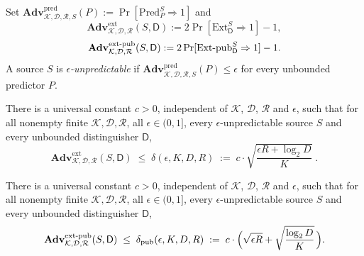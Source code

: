 \documentclass{aicr-conjecture}
\newcommand{\Adv}{\mathbf{Adv}}
\newcommand{\Pred}{\mathrm{Pred}}
\newcommand{\Ext}{\mathrm{Ext}}
\newcommand{\ExtP}{\mathrm{Ext}\text{-}\mathrm{pub}}
\newcommand{\pred}{\mathrm{pred}}
\newcommand{\ext}{\mathrm{ext}}
\newcommand{\extpub}{\textup{ext-pub}}
\newcommand{\calK}{\mathcal{K}}
\newcommand{\calD}{\mathcal{D}}
\newcommand{\calR}{\mathcal{R}}
\begin{document}
\begin{definition}\label{def:games}
Set $\Adv^{\pred}_{\calK,\calD,\calR,S}(P) := \Pr[\Pred^{S}_{P} \Rightarrow 1]$ and
\[
  \Adv^{\ext}_{\calK,\calD,\calR}(S,\mathsf{D}) := 2\Pr[\Ext^{S}_{\mathsf{D}} \Rightarrow 1] - 1 ,
\]
\[
  \Adv^{\extpub}_{\calK,\calD,\calR}(S,\mathsf{D}) := 2\Pr[\ExtP^{S}_{\mathsf{D}} \Rightarrow 1] - 1 .
\]
A source $S$ is \emph{$\epsilon$-unpredictable} if
$\Adv^{\pred}_{\calK,\calD,\calR,S}(P) \le \epsilon$ for every unbounded predictor $P$.
\end{definition}

\begin{conjecture}\label{conj:main}
There is a universal constant $c > 0$, independent of $\calK$, $\calD$, $\calR$ and $\epsilon$, such
that for all nonempty finite $\calK, \calD, \calR$, all $\epsilon \in (0,1]$, every
$\epsilon$-unpredictable source $S$ and every unbounded distinguisher $\mathsf{D}$,
\[
  \Adv^{\ext}_{\calK,\calD,\calR}(S,\mathsf{D})
  \;\le\; \delta(\epsilon, K, D, R)
  \;:=\; c \cdot \sqrt{\frac{\epsilon R + \log_2 D}{K}} \; .
\]
\end{conjecture}

\begin{conjecture}\label{conj:pub}
There is a universal constant $c > 0$, independent of $\calK$, $\calD$, $\calR$ and $\epsilon$, such
that for all nonempty finite $\calK, \calD, \calR$, all $\epsilon \in (0,1]$, every
$\epsilon$-unpredictable source $S$ and every unbounded distinguisher $\mathsf{D}$,
\[
  \Adv^{\extpub}_{\calK,\calD,\calR}(S,\mathsf{D})
  \;\le\; \delta_{\mathrm{pub}}(\epsilon, K, D, R)
  \;:=\; c \cdot \Bigl( \sqrt{\epsilon R} + \sqrt{\frac{\log_2 D}{K}} \,\Bigr) .
\]
\end{conjecture}
\end{document}
